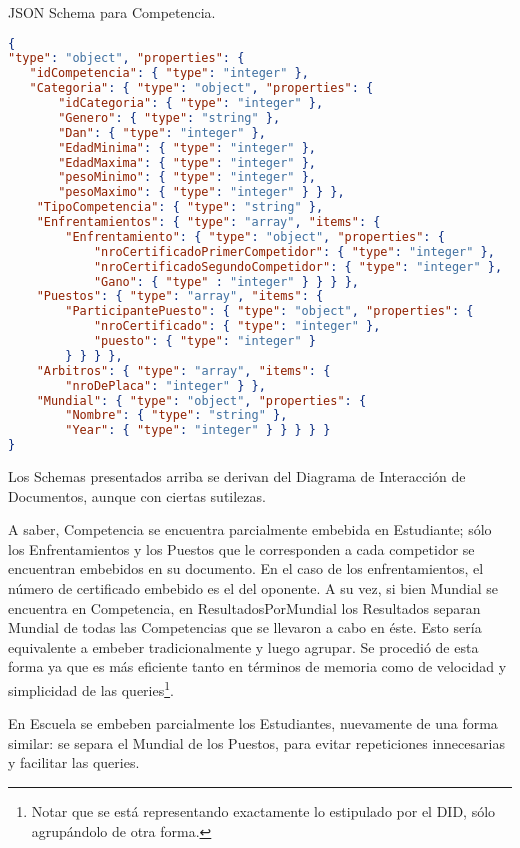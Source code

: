 JSON Schema para Competencia.
\begin{lstlisting}[language=json]
{
"type": "object", "properties": {
   "idCompetencia": { "type": "integer" },
   "Categoria": { "type": "object", "properties": {
       "idCategoria": { "type": "integer" },
       "Genero": { "type": "string" },
       "Dan": { "type": "integer" },
       "EdadMinima": { "type": "integer" },
       "EdadMaxima": { "type": "integer" },
       "pesoMinimo": { "type": "integer" },
       "pesoMaximo": { "type": "integer" } } },
    "TipoCompetencia": { "type": "string" },
    "Enfrentamientos": { "type": "array", "items": {
        "Enfrentamiento": { "type": "object", "properties": {
            "nroCertificadoPrimerCompetidor": { "type": "integer" },
            "nroCertificadoSegundoCompetidor": { "type": "integer" },
            "Gano": { "type" : "integer" } } } },
    "Puestos": { "type": "array", "items": {
        "ParticipantePuesto": { "type": "object", "properties": {
            "nroCertificado": { "type": "integer" },
            "puesto": { "type": "integer" }
        } } } },
    "Arbitros": { "type": "array", "items": {
        "nroDePlaca": "integer" } },
    "Mundial": { "type": "object", "properties": {
        "Nombre": { "type": "string" },
        "Year": { "type": "integer" } } } } }
}
\end{lstlisting}

\par Los Schemas presentados arriba se derivan del Diagrama de Interacción de Documentos, aunque con ciertas sutilezas.

\par A saber, Competencia se encuentra parcialmente embebida en Estudiante; sólo los Enfrentamientos y los Puestos que le corresponden a cada competidor se encuentran embebidos en su documento.
En el caso de los enfrentamientos, el número de certificado embebido es el del oponente.
A su vez, si bien Mundial se encuentra en Competencia, en ResultadosPorMundial los Resultados separan Mundial de 
todas las Competencias que se llevaron a cabo en éste.
Esto sería equivalente a embeber tradicionalmente y luego agrupar.
Se procedió de esta forma ya que es más eficiente tanto en términos de memoria como de velocidad y simplicidad de
las queries\footnote{Notar que se está representando exactamente lo estipulado por el DID, 
sólo agrupándolo de otra forma.}.

\par En Escuela se embeben parcialmente los Estudiantes, nuevamente de una forma similar: se separa el Mundial 
de los Puestos, para evitar repeticiones innecesarias y facilitar las queries.
